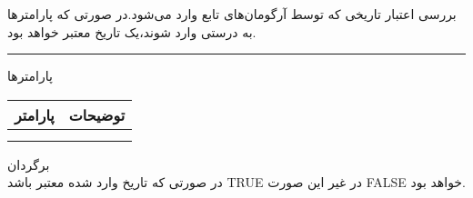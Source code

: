 بررسی اعتبار تاریخی که توسط آرگومان‌های تابع وارد می‌شود.در صورتی که پارامترها به درستی وارد شوند،یک تاریخ معتبر خواهد بود.
\\
\rule{\linewidth}{0.5mm}

پارامترها
\\
\begin{tabular}{|c|c|}
	\hline
	 پارامتر	& توضیحات \\
	\hline
	&  \\
	\hline
	&  \\
	\hline
\end{tabular}

برگردان
\\
در صورتی که تاریخ وارد شده معتبر باشد TRUE در غیر این صورت FALSE خواهد بود.

